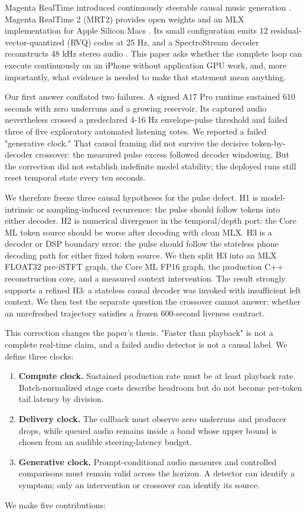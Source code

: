 \documentclass[10pt]{article}
\begin{document}
Magenta RealTime introduced continuously steerable causal music generation \citep{live-music-models}. Magenta RealTime 2 (MRT2) provides open weights and an MLX implementation for Apple Silicon Macs \citep{mrt2}. Its small configuration emits 12 residual-vector-quantized (RVQ) codes at 25 Hz, and a SpectroStream decoder reconstructs 48 kHz stereo audio \citep{mrt2-model-card}. This paper asks whether the complete loop can execute continuously on an iPhone without application GPU work, and, more importantly, what evidence is needed to make that statement mean anything.

Our first answer conflated two failures. A signed A17 Pro runtime sustained 610 seconds with zero underruns and a growing reservoir. Its captured audio nevertheless crossed a predeclared 4-16 Hz envelope-pulse threshold and failed three of five exploratory automated listening votes. We reported a failed "generative clock." That causal framing did not survive the decisive token-by-decoder crossover: the measured pulse excess followed decoder windowing. But the correction did not establish indefinite model stability; the deployed runs still reset temporal state every ten seconds.

We therefore freeze three causal hypotheses for the pulse defect. H1 is model-intrinsic or sampling-induced recurrence: the pulse should follow tokens into either decoder. H2 is numerical divergence in the temporal/depth port: the Core ML token source should be worse after decoding with clean MLX. H3 is a decoder or DSP boundary error: the pulse should follow the stateless phone decoding path for either fixed token source. We then split H3 into an MLX FLOAT32 pre-iSTFT graph, the Core ML FP16 graph, the production C++ reconstruction core, and a measured context intervention. The result strongly supports a refined H3: a stateless causal decoder was invoked with insufficient left context. We then test the separate question the crossover cannot answer: whether an unrefreshed trajectory satisfies a frozen 600-second liveness contract.

This correction changes the paper's thesis. "Faster than playback" is not a complete real-time claim, and a failed audio detector is not a causal label. We define three clocks:

\begin{enumerate}
\item \textbf{Compute clock.} Sustained production rate must be at least playback rate. Batch-normalized stage costs describe headroom but do not become per-token tail latency by division.
\item \textbf{Delivery clock.} The callback must observe zero underruns and producer drops, while queued audio remains inside a band whose upper bound is chosen from an audible steering-latency budget.
\item \textbf{Generative clock.} Prompt-conditional audio measures and controlled comparisons must remain valid across the horizon. A detector can identify a symptom; only an intervention or crossover can identify its source.
\end{enumerate}
We make five contributions:
\end{document}
